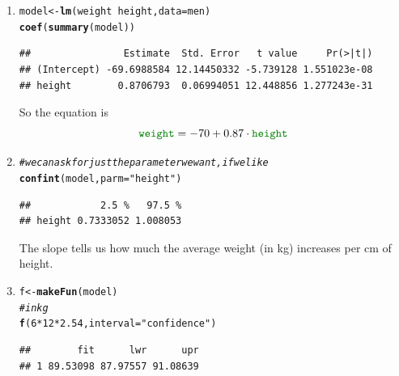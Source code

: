 \documentclass[twoside]{book}\usepackage[]{graphicx}\usepackage[]{xcolor}
\makeatletter
\newcommand{\hlnum}[1]{\textcolor[rgb]{0.686,0.059,0.569}{#1}}%
\newcommand{\hlstr}[1]{\textcolor[rgb]{0.192,0.494,0.8}{#1}}%
\newcommand{\hlcom}[1]{\textcolor[rgb]{0.678,0.584,0.686}{\textit{#1}}}%
\newcommand{\hlopt}[1]{\textcolor[rgb]{0,0,0}{#1}}%
\newcommand{\hlstd}[1]{\textcolor[rgb]{0.345,0.345,0.345}{#1}}%
\newcommand{\hlkwb}[1]{\textcolor[rgb]{0.69,0.353,0.396}{#1}}%
\newcommand{\hlkwc}[1]{\textcolor[rgb]{0.333,0.667,0.333}{#1}}%
\newcommand{\hlkwd}[1]{\textcolor[rgb]{0.737,0.353,0.396}{\textbf{#1}}}%
\newenvironment{kframe}{%
 \def\at@end@of@kframe{}%
 \ifinner\ifhmode%
  \def\at@end@of@kframe{\end{minipage}}%
  \begin{minipage}{\columnwidth}%
 \fi\fi%
 \def\FrameCommand##1{\hskip\@totalleftmargin \hskip-\fboxsep
 \colorbox{shadecolor}{##1}\hskip-\fboxsep
     \hskip-\linewidth \hskip-\@totalleftmargin \hskip\columnwidth}%
 \MakeFramed {\advance\hsize-\width
   \@totalleftmargin\z@ \linewidth\hsize
   \@setminipage}}%
 {\par\unskip\endMakeFramed%
 \at@end@of@kframe}
\newenvironment{knitrout}{}{} %
\newcommand{\variable}[1]{{\color{green!50!black}\texttt{#1}}}
\makeatother
\begin{document}
\begin{solution}
	\begin{enumerate}
		\item
\begin{knitrout}
\color{fgcolor}\begin{kframe}
\begin{alltt}
\hlstd{model} \hlkwb{<-} \hlkwd{lm}\hlstd{(weight} \hlopt{~} \hlstd{height,} \hlkwc{data} \hlstd{= men)}
\hlkwd{coef}\hlstd{(}\hlkwd{summary}\hlstd{(model))}
\end{alltt}
\begin{verbatim}
##                Estimate  Std. Error   t value     Pr(>|t|)
## (Intercept) -69.6988584 12.14450332 -5.739128 1.551023e-08
## height        0.8706793  0.06994051 12.448856 1.277243e-31
\end{verbatim}
\end{kframe}
\end{knitrout}
			So the equation is 
			\[
			\variable{weight} = 
			\ensuremath{-70} + 
			0.87 \cdot \variable{height}
			\]
		\item
\begin{knitrout}
\color{fgcolor}\begin{kframe}
\begin{alltt}
\hlcom{# we can ask for just the parameter we want, if we like}
\hlkwd{confint}\hlstd{(model,} \hlkwc{parm} \hlstd{=} \hlstr{"height"}\hlstd{)}
\end{alltt}
\begin{verbatim}
##            2.5 %   97.5 %
## height 0.7333052 1.008053
\end{verbatim}
\end{kframe}
\end{knitrout}
The slope tells us how much the average weight (in kg) increases per 
cm of height.
		\item
\begin{knitrout}
\color{fgcolor}\begin{kframe}
\begin{alltt}
\hlstd{f} \hlkwb{<-} \hlkwd{makeFun}\hlstd{(model)}
\hlcom{# in kg}
\hlkwd{f}\hlstd{(}\hlnum{6} \hlopt{*} \hlnum{12} \hlopt{*} \hlnum{2.54}\hlstd{,} \hlkwc{interval} \hlstd{=} \hlstr{"confidence"}\hlstd{)}
\end{alltt}
\begin{verbatim}
##        fit      lwr      upr
## 1 89.53098 87.97557 91.08639

\end{verbatim}
\end{kframe}
\end{knitrout}
\end{enumerate}
\end{solution}
\end{document}
